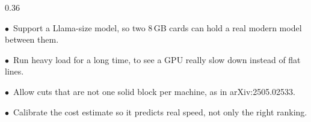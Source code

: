 \documentclass[aspectratio=169,11pt]{beamer}
\begin{document}
{\begin{frame}[shrink=20]
\begin{columns}[T]
\begin{column}{0.36\textwidth}
{\begin{minipage}{\dimexpr\textwidth-14pt\relax}
      {\scriptsize\color{white!62!keink}
       \textcolor{keteal}{$\bullet$}\ Support a Llama-size model, so two
       8\,GB cards can hold a real modern model between
       them.\par\vspace{0.4em}
       \textcolor{keteal}{$\bullet$}\ Run heavy load for a long time, to see a
       GPU really slow down instead of flat lines.\par\vspace{0.4em}
       \textcolor{keteal}{$\bullet$}\ Allow cuts that are not one solid block
       per machine, as in arXiv:2505.02533.\par\vspace{0.4em}
       \textcolor{keteal}{$\bullet$}\ Calibrate the cost estimate so it predicts
       real speed, not only the right ranking.}
      \vspace{0.4em}
    \end{minipage}}
  \end{column}
  \end{columns}
\end{frame}}
\end{document}
